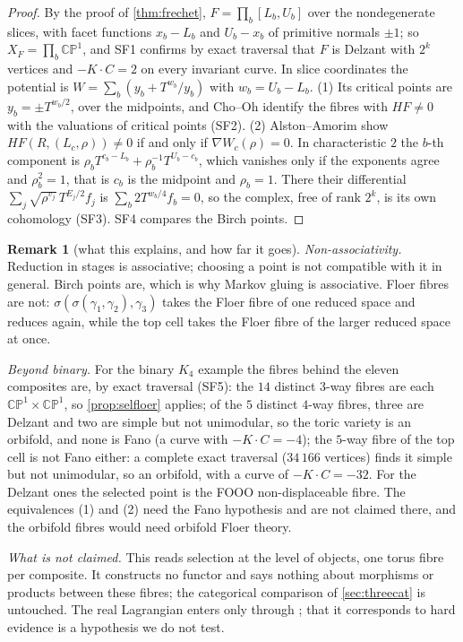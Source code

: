 \documentclass[11pt]{article}
\theoremstyle{definition}\newtheorem{definition}[theorem]{Definition}\newtheorem{remark}[theorem]{Remark}\newtheorem{example}[theorem]{Example}\newtheorem{problem}[theorem]{Open problem}\crefname{problem}{Problem}{Problems}
\begin{document}
\begin{proof}
By the proof of \cref{thm:frechet}, $F=\prod_b[L_b,U_b]$ over the nondegenerate slices, with facet functions $x_b-L_b$ and $U_b-x_b$ of primitive normals $\pm1$; so $X_F=\prod_b\mathbb{CP}^1$, and SF1 confirms by
exact traversal that $F$ is Delzant with $2^k$ vertices and $-K\cdot C=2$ on every invariant curve. In slice coordinates the potential is $W=\sum_b(y_b+T^{w_b}/y_b)$ with $w_b=U_b-L_b$. (1) Its critical points are
$y_b=\pm T^{w_b/2}$, over the midpoints, and Cho--Oh identify the fibres with $HF\ne0$ with the valuations of critical points (SF2). (2) Alston--Amorim show $HF(R,(L_c,\rho))\ne0$ if and only if
$\nabla W_c(\rho)=0$. In characteristic $2$ the $b$-th component is $\rho_bT^{c_b-L_b}+\rho_b^{-1}T^{U_b-c_b}$, which vanishes only if the exponents agree and $\rho_b^2=1$, that is $c_b$ is the midpoint and $\rho_b=1$.
There their differential $\sum_j\sqrt{\rho^{v_j}}\,T^{E_j/2}f_j$ is $\sum_b2T^{w_b/4}f_b=0$, so the complex, free of rank $2^k$, is its own cohomology (SF3). SF4 compares the Birch points.
\end{proof}

\begin{remark}[what this explains, and how far it goes]\label{rem:selfloer}
\emph{Non-associativity.} Reduction in stages is associative; choosing a point is not compatible with it in general. Birch points are, which is why Markov gluing is associative. Floer fibres are not:
$\sigma(\sigma(\gamma_1,\gamma_2),\gamma_3)$ takes the Floer fibre of one reduced space and reduces again, while the top cell takes the Floer fibre of the larger reduced space at once.

\emph{Beyond binary.} For the binary $K_4$ example the fibres behind the eleven composites are, by exact traversal (SF5): the $14$ distinct $3$-way fibres are each $\mathbb{CP}^1\times\mathbb{CP}^1$, so
\cref{prop:selfloer} applies; of the $5$ distinct $4$-way fibres, three are Delzant and two are simple but not unimodular, so the toric variety is an orbifold, and none is Fano (a curve with $-K\cdot C=-4$);
the $5$-way fibre of the top cell is not Fano either: a complete exact traversal ($34\,166$ vertices) finds it simple but not unimodular, so an orbifold, with a curve of $-K\cdot C=-32$. For the Delzant ones the selected point is the FOOO non-displaceable fibre. The
equivalences (1) and (2) need the Fano hypothesis and are not claimed there, and the orbifold fibres would need orbifold Floer theory.

\emph{What is not claimed.} This reads selection at the level of objects, one torus fibre per composite. It constructs no functor and says nothing about morphisms or products between these fibres; the
categorical comparison of \cref{sec:threecat} is untouched. The real Lagrangian enters only through \cite{AlstonAmorim2010}; that it corresponds to hard evidence is a hypothesis we do not test.
\end{remark}
\end{document}

